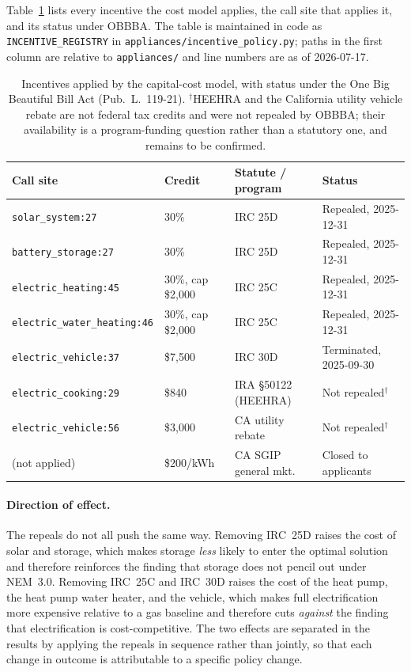 \documentclass[11pt]{article}
\begin{document}
\sloppypar
Table~\ref{tab:incentives} lists every incentive the cost model applies, the call site
that applies it, and its status under OBBBA. The table is maintained in code as
\texttt{INCENTIVE\_REGISTRY} in \texttt{appliances/incentive\_policy.py}; paths in the
first column are relative to \texttt{appliances/} and line numbers are as of 2026-07-17.

\begin{table}[h]
\centering
\footnotesize
\begin{tabular}{@{}l l l l@{}}
\toprule
Call site & Credit & Statute / program & Status \\
\midrule
\texttt{solar\_system:27}        & 30\%              & IRC 25D  & Repealed, 2025-12-31 \\
\texttt{battery\_storage:27}     & 30\%              & IRC 25D  & Repealed, 2025-12-31 \\
\texttt{electric\_heating:45}    & 30\%, cap \$2,000 & IRC 25C  & Repealed, 2025-12-31 \\
\texttt{electric\_water\_heating:46} & 30\%, cap \$2,000 & IRC 25C & Repealed, 2025-12-31 \\
\texttt{electric\_vehicle:37}    & \$7,500           & IRC 30D  & Terminated, 2025-09-30 \\
\texttt{electric\_cooking:29}    & \$840             & IRA \S50122 (HEEHRA) & Not repealed$^{\dagger}$ \\
\texttt{electric\_vehicle:56}    & \$3,000           & CA utility rebate & Not repealed$^{\dagger}$ \\
\midrule
(not applied)                    & \$200/kWh         & CA SGIP general mkt. & Closed to applicants \\
\bottomrule
\end{tabular}
\caption{Incentives applied by the capital-cost model, with status under the One Big
Beautiful Bill Act (Pub.~L.~119-21). $^{\dagger}$HEEHRA and the California utility
vehicle rebate are not federal tax credits and were not repealed by OBBBA; their
availability is a program-funding question rather than a statutory one, and remains to
be confirmed.}
\label{tab:incentives}
\end{table}

\paragraph{Direction of effect.} The repeals do not all push the same way. Removing
IRC~25D raises the cost of solar and storage, which makes storage \emph{less} likely to
enter the optimal solution and therefore reinforces the finding that storage does not
pencil out under NEM~3.0. Removing IRC~25C and IRC~30D raises the cost of the heat pump,
the heat pump water heater, and the vehicle, which makes full electrification more
expensive relative to a gas baseline and therefore cuts \emph{against} the finding that
electrification is cost-competitive. The two effects are separated in the results by
applying the repeals in sequence rather than jointly, so that each change in outcome is
attributable to a specific policy change.
\end{document}

